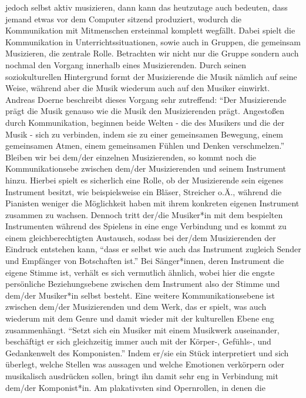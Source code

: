 jedoch selbst aktiv musizieren, dann kann das heutzutage auch bedeuten, dass
jemand etwas vor dem Computer sitzend produziert, wodurch die Kommunikation mit
Mitmenschen ersteinmal komplett wegfällt. Dabei spielt die Kommunikation in
Unterrichtssituationen, sowie auch in Gruppen, die gemeinsam Musizieren, die
zentrale Rolle. Betrachten wir nicht nur die Gruppe sondern auch nochmal den
Vorgang innerhalb eines Musizierenden. Durch seinen soziokulturellen Hintergrund
formt der Musizierende die Musik nämlich auf seine Weise, während aber die Musik
wiederum auch auf den Musiker einwirkt. Andreas Doerne beschreibt dieses Vorgang
sehr zutreffend: \enquote{Der Musizierende prägt die Musik genauso wie die Musik
den Musizierenden prägt. Angestoßen durch Kommunikation, beginnen beide Welten -
die des Musikers und die der Musik - sich zu verbinden, indem sie zu einer
gemeinsamen Bewegung, einem gemeinsamen Atmen, einem gemeinsamen Fühlen und
Denken verschmelzen.} \autocite[60]{doerne:umfassend_musizieren} Bleiben wir bei
dem/der einzelnen Musizierenden, so kommt noch die Kommunikationsebe zwischen
dem/der Musizierenden und seinem Instrument hinzu. Hierbei spielt es sicherlich
eine Rolle, ob der Musizierende sein eigenes Instrument besitzt, wie
beispielsweise ein Bläser, Streicher o.Ä., während die Pianisten weniger die
Möglichkeit haben mit ihrem konkreten eigenen Instrument zusammen zu wachsen.
Dennoch tritt der/die Musiker*in mit dem bespielten Instrumenten während des
Spielens in eine enge Verbindung und es kommt zu einem gleichberechtigten
Austausch, sodass bei der/dem Musizierenden der Eindruck entstehen kann,
\enquote{dass er selbst wie auch das Instrument zugleich Sender und Empfänger
von Botschaften ist.} \autocite[59]{doerne:umfassend_musizieren} Bei
Sänger*innen, deren Instrument die eigene Stimme ist, verhält es sich vermutlich
ähnlich, wobei hier die engste persönliche Beziehungsebene zwischen dem
Instrument also der Stimme und dem/der Musiker*in selbst besteht. Eine weitere
Kommunikationsebene ist zwischen dem/der Musizierenden und dem Werk, das er
spielt, was auch wiederum mit dem Genre und damit wieder mit der kulturellen
Ebene eng zusammenhängt. \enquote{Setzt sich ein Musiker mit einem Musikwerk
auseinander, beschäftigt er sich gleichzeitig immer auch mit der Körper-,
Gefühls-, und Gedankenwelt des Komponisten.}
\autocite[59]{doerne:umfassend_musizieren} Indem er/sie ein Stück interpretiert
und sich überlegt, welche Stellen was aussagen und welche Emotionen verkörpern
oder musikalisch ausdrücken sollen, bringt ihn damit sehr eng in Verbindung mit
dem/der Komponist*in. Am plakativsten sind Opernrollen, in denen die
